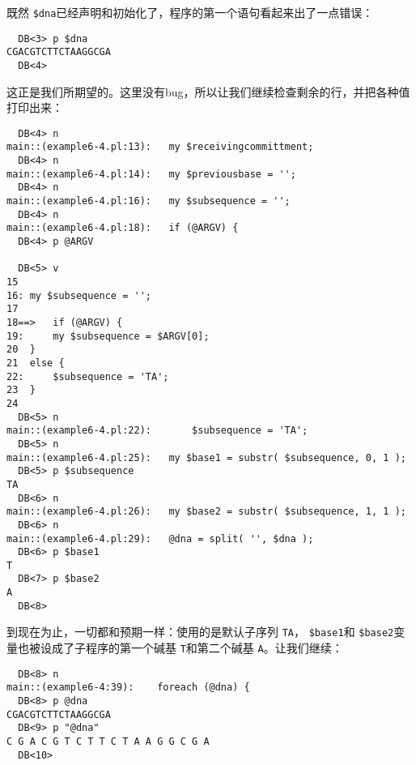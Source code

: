 既然 \verb|$dna|已经声明和初始化了，程序的第一个语句看起来出了一点错误：

\begin{lstlisting}
  DB<3> p $dna
CGACGTCTTCTAAGGCGA
  DB<4> 
\end{lstlisting}

这正是我们所期望的。这里没有bug，所以让我们继续检查剩余的行，并把各种值打印出来：


\begin{lstlisting}
  DB<4> n
main::(example6-4.pl:13):	my $receivingcommittment;
  DB<4> n
main::(example6-4.pl:14):	my $previousbase = '';
  DB<4> n
main::(example6-4.pl:16):	my $subsequence = '';
  DB<4> n
main::(example6-4.pl:18):	if (@ARGV) {
  DB<4> p @ARGV

  DB<5> v
15 	
16:	my $subsequence = '';
17 	
18==>	if (@ARGV) {
19:	    my $subsequence = $ARGV[0];
20 	}
21 	else {
22:	    $subsequence = 'TA';
23 	}
24 	
  DB<5> n
main::(example6-4.pl:22):	    $subsequence = 'TA';
  DB<5> n
main::(example6-4.pl:25):	my $base1 = substr( $subsequence, 0, 1 );
  DB<5> p $subsequence
TA
  DB<6> n
main::(example6-4.pl:26):	my $base2 = substr( $subsequence, 1, 1 );
  DB<6> n
main::(example6-4.pl:29):	@dna = split( '', $dna );
  DB<6> p $base1
T
  DB<7> p $base2
A
  DB<8> 
\end{lstlisting}

到现在为止，一切都和预期一样：使用的是默认子序列 \verb|TA|， \verb|$base1|和 \verb|$base2|变量也被设成了子程序的第一个碱基 \verb|T|和第二个碱基 \verb|A|。让我们继续：

\begin{lstlisting}
  DB<8> n
main::(example6-4:39):    foreach (@dna) {
  DB<8> p @dna
CGACGTCTTCTAAGGCGA
  DB<9> p "@dna"
C G A C G T C T T C T A A G G C G A
  DB<10> 
\end{lstlisting}

